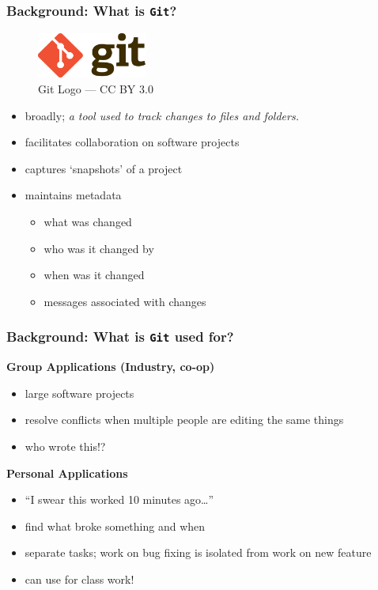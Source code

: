\documentclass{beamer} \usetheme{Madrid}
\begin{document}
\begin{frame}
    \frametitle{Background: What is \texttt{Git}?}
    \vfill
    \begin{figure}
        \includegraphics[height=15mm]{logo.png}
        \caption{Git Logo --- CC BY 3.0}
    \end{figure}
    \vfill
    \begin{itemize}
        \item broadly; \emph{a tool used to track changes to files and folders.}
        \item facilitates collaboration on software projects
        \item captures `snapshots' of a project
        \item maintains metadata
        \begin{itemize}
            \item what was changed
            \item who was it changed by
            \item when was it changed
            \item messages associated with changes
        \end{itemize}
    \end{itemize}
    \vfill
\end{frame}

\begin{frame}
    \frametitle{Background: What is \texttt{Git} used for?}
    \vfill
    \centering \textbf{Group Applications (Industry, co-op)}
    \begin{itemize}
        \item large software projects
        \item resolve conflicts when multiple people are editing the same things
        \item who wrote this!?
    \end{itemize}
    \vfill
    \centering \textbf{Personal Applications}
    \begin{itemize}
        \item ``I swear this worked 10 minutes ago\ldots''
        \item find what broke something and when
        \item separate tasks; work on bug fixing is isolated from work on new feature
        \item can use for class work!
    \end{itemize}
    \vfill
\end{frame}
\end{document}
